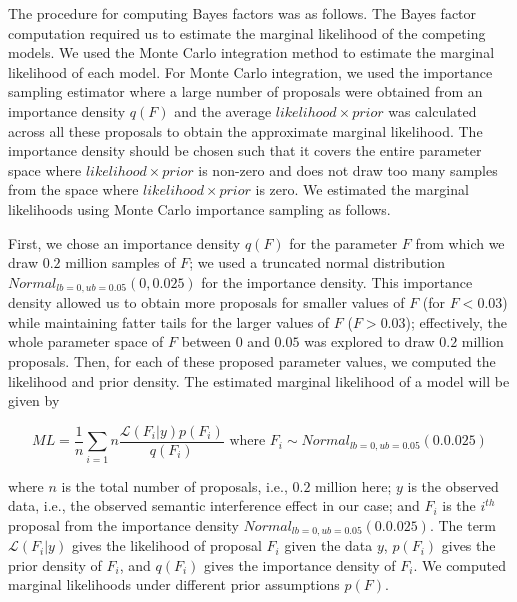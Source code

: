 \documentclass[review,preprint,12pt,authoryear,floatsintext]{elsarticle}
\begin{document}
{{The procedure for computing Bayes factors was as follows. The Bayes factor computation required us to estimate the marginal likelihood of the competing models. We used the Monte Carlo integration method to estimate the marginal likelihood of each model. For Monte Carlo integration, we used the importance sampling estimator where a large number of proposals were obtained from an importance density $q(F)$ and the average $likelihood \times prior$ was calculated across all these proposals to obtain the approximate marginal likelihood. The importance density should be chosen such that it covers the entire parameter space where $likelihood \times prior$ is non-zero and does not draw too many samples from the space where $likelihood \times prior$ is zero. We estimated the marginal likelihoods using Monte Carlo importance sampling as follows. 

First, we chose an importance density $q(F)$ for the parameter $F$ from which we draw $0.2$ million samples of $F$; we used a truncated normal distribution $Normal_{lb=0,ub=0.05}(0,0.025)$ for the importance density. This importance density allowed us to obtain more proposals for smaller values of $F$ (for $F<0.03$) while maintaining fatter tails for the larger values of $F$ ($F>0.03$); effectively, the whole parameter space of $F$ between $0$ and $0.05$ was explored to draw $0.2$ million proposals. Then, for each of these proposed parameter values, we computed the likelihood and prior density. The estimated marginal likelihood of a model will be given by

\begin{equation}
ML = \frac{1}{n} \sum_{i=1}{n} \frac{\mathcal{L}(F_i|y) p(F_i)}{q(F_i)} \text{ where } F_i \sim Normal_{lb=0,ub=0.05}(0.0.025) 
\end{equation}

\noindent where $n$ is the total number of proposals, i.e., $0.2$ million here; $y$ is the observed data, i.e., the observed semantic interference effect in our case; and $F_i$ is the $i^{th}$ proposal from the importance density $Normal_{lb=0,ub=0.05}(0.0.025) $. 
The term $\mathcal{L}(F_i|y)$ gives the likelihood of proposal $F_i$ given the data $y$, $p(F_i)$ gives the prior density of $F_i$, and $q(F_i)$ gives the importance density of $F_i$. We computed marginal likelihoods under different prior assumptions $p(F)$.

}}
\end{document}
